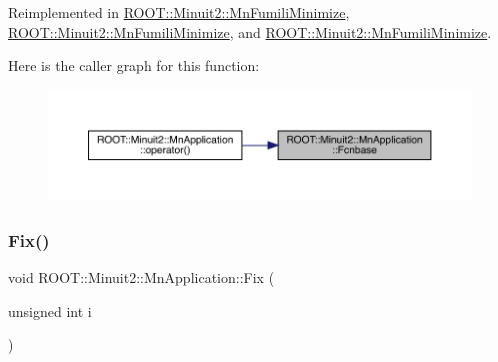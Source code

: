 Reimplemented in \mbox{\hyperlink{classROOT_1_1Minuit2_1_1MnFumiliMinimize_a4540fd0311c15810965864988d4c70d1}{R\+O\+O\+T\+::\+Minuit2\+::\+Mn\+Fumili\+Minimize}}, \mbox{\hyperlink{classROOT_1_1Minuit2_1_1MnFumiliMinimize_a4540fd0311c15810965864988d4c70d1}{R\+O\+O\+T\+::\+Minuit2\+::\+Mn\+Fumili\+Minimize}}, and \mbox{\hyperlink{classROOT_1_1Minuit2_1_1MnFumiliMinimize_a4540fd0311c15810965864988d4c70d1}{R\+O\+O\+T\+::\+Minuit2\+::\+Mn\+Fumili\+Minimize}}.

Here is the caller graph for this function\+:
\nopagebreak
\begin{figure}[H]
\begin{center}
\leavevmode
\includegraphics[width=350pt]{df/dd5/classROOT_1_1Minuit2_1_1MnApplication_af4eb3fe4927d3a8e0efcd5c6b7100881_icgraph}
\end{center}
\end{figure}
\mbox{\label{classROOT_1_1Minuit2_1_1MnApplication_a98bea1ca3fb2a311b1c0e72a58ec2d9f}} 
\subsubsection{\texorpdfstring{Fix()}{Fix()}\hspace{0.1cm}{\footnotesize\ttfamily [1/6]}}
{\footnotesize\ttfamily void R\+O\+O\+T\+::\+Minuit2\+::\+Mn\+Application\+::\+Fix (\begin{DoxyParamCaption}\item[{unsigned int}]{i }\end{DoxyParamCaption})}

